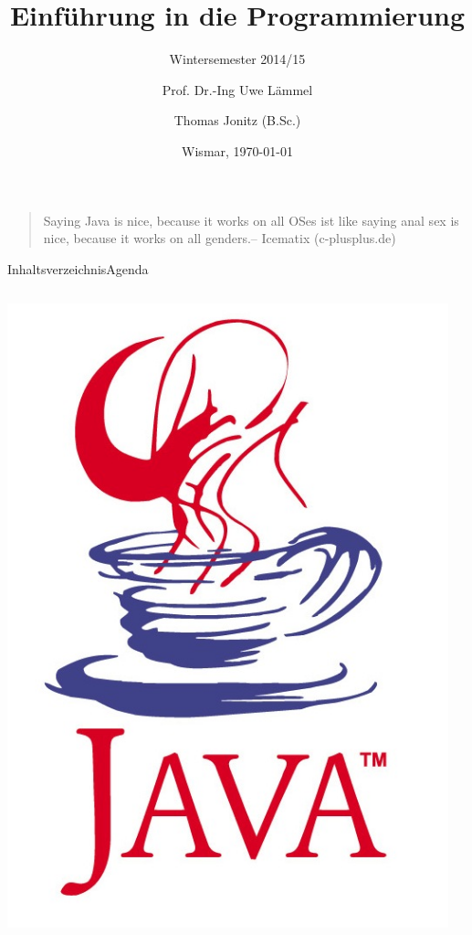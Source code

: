 \documentclass{hswbeamer}
\title[EiP]{Einführung in die Programmierung}
\subtitle[WS 2014/15]{Wintersemester 2014/15}
\author[\Copyright{Uwe L\"{a}mmel, Thomas Jonitz}]{Prof. Dr.-Ing Uwe L\"{a}mmel \and Thomas Jonitz (B.Sc.)}
\date{Wismar, \today}
\begin{document}
\begin{frame}
    \begin{quote}
        \glqq Saying Java is nice, because it works on all OSes ist like saying anal sex is nice, because it works on all genders.\grqq -- Icematix (c-plusplus.de)
    \end{quote}
\end{frame}

\begin{frame}
    \maketitle
\end{frame}

\begin{frame}{Inhaltsverzeichnis}{Agenda}
    \begin{columns}
        \begin{column}{0.4\textwidth}
            \includegraphics[width=0.9\columnwidth]{img/java-tm.jpg}
        \end{column}
        \begin{column}{0.6\textwidth}
            \tableofcontents[hideothersections]
        \end{column}
    \end{columns}
\end{frame}
\end{document}
